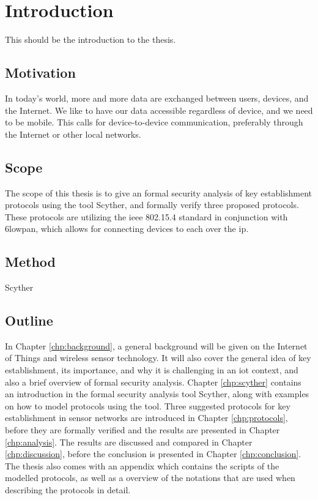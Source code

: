 \chapter{Introduction}
\label{chp:introduction} 

This should be the introduction to the thesis.


\section{Motivation}

In today's world, more and more data are exchanged between users, devices, and the Internet. We like to have our data accessible regardless of device, and we need to be mobile. This calls for device-to-device communication, preferably through the Internet or other local networks.



\section{Scope}

The scope of this thesis is to give an formal security analysis of key establishment protocols using the tool Scyther, and formally verify three proposed protocols. These protocols are utilizing the \gls{ieee} 802.15.4 standard in conjunction with \gls{6lowpan}, which allows for connecting devices to each over the \gls{ip}. 

\section{Method}

Scyther

\section{Outline}

In Chapter \ref{chp:background}, a general background will be given on the Internet of Things and wireless sensor technology. It will also cover the general idea of key establishment, its importance, and why it is challenging in an \gls{iot} context, and also a brief overview of formal security analysis. Chapter \ref{chp:scyther} contains an introduction in the formal security analysis tool Scyther, along with examples on how to model protocols using the tool. Three suggested protocols for key establishment in sensor networks are introduced in Chapter \ref{chp:protocols}, before they are formally verified and the results are presented in Chapter \ref{chp:analysis}. The results are discussed and compared in Chapter \ref{chp:discussion}, before the conclusion is presented in Chapter \ref{chp:conclusion}. The thesis also comes with an appendix which contains the scripts of the modelled protocols, as well as a overview of the notations that are used when describing the protocols in detail.